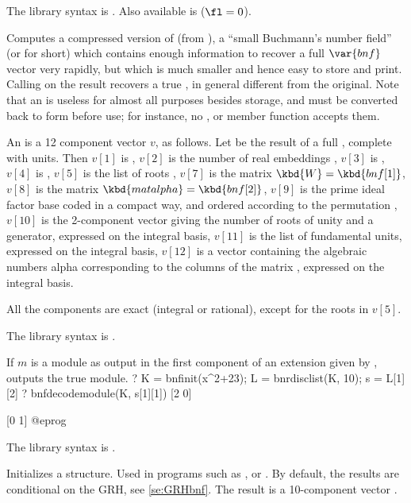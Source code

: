 The library syntax is .
Also available is   ($\fl=0$).

\label{se:bnfcompress}
Computes a compressed version of  (from ), a
``small Buchmann's number field'' (or  for short) which contains
enough information to recover a full $\var{bnf}$ vector very rapidly, but
which is much smaller and hence easy to store and print. Calling
 on the result recovers a true , in general different
from the original. Note that an  is useless for almost all
purposes besides storage, and must be converted back to  form
before use; for instance, no ,  or member function
accepts them.

An  is a 12 component vector $v$, as follows. Let  be
the result of a full , complete with units. Then $v[1]$ is
, $v[2]$ is the number of real embeddings ,
$v[3]$ is , $v[4]$ is , $v[5]$ is the list of roots
, $v[7]$ is the matrix $\kbd{W} = \kbd{bnf[1]}$,
$v[8]$ is the matrix $\kbd{matalpha}=\kbd{bnf[2]}$,
$v[9]$ is the prime ideal factor base  coded in a compact way,
and ordered according to the permutation , $v[10]$ is the
2-component vector giving the number of roots of unity and a generator,
expressed on the integral basis, $v[11]$ is the list of fundamental units,
expressed on the integral basis, $v[12]$ is a vector containing the algebraic
numbers alpha corresponding to the columns of the matrix ,
expressed on the integral basis.

All the components are exact (integral or rational), except for the roots in
$v[5]$.

The library syntax is .

\label{se:bnfdecodemodule}
If $m$ is a module as output in the
first component of an extension given by , outputs the
true module.
\bprog
? K = bnfinit(x^2+23); L = bnrdisclist(K, 10); s = L[1][2]
? bnfdecodemodule(K, s[1][1])
[2 0]

[0 1]
@eprog

The library syntax is .

\label{se:bnfinit}
Initializes a
 structure. Used in programs such as ,
 or . By default, the results are conditional
on the GRH, see \ref{se:GRHbnf}. The result is a
10-component vector .

